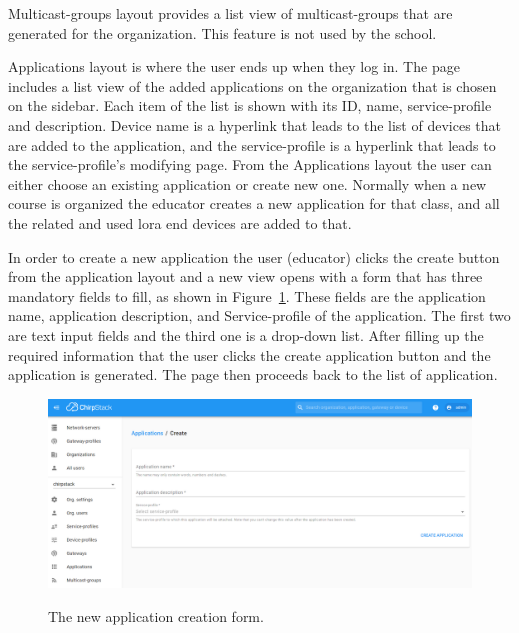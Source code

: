Multicast-groups layout provides a list view of multicast-groups that are generated for the organization.
This feature is not used by the school.

Applications layout is where the user ends up when they log in.
The page includes a list view of the added applications on the organization that is chosen on the sidebar.
Each item of the list is shown with its ID, name, service-profile and description.
Device name is a hyperlink that leads to the list of devices that are added to the application, and the service-profile is a hyperlink that leads to the service-profile's modifying page.
From the Applications layout the user can either choose an existing application or create new one.
Normally when a new course is organized the educator creates a new application for that class, and all the related and used \gls{lora} end devices are added to that.

In order to create a new application the user (educator) clicks the create button from the application layout and a new view opens with a form that has three mandatory fields to fill, as shown in Figure~\ref{fig:ChirpStack_new_application}.
These fields are the application name, application description, and Service-profile of the application.
The first two are text input fields and the third one is a drop-down list.
After filling up the required information that the user clicks the create application button and the application is generated.
The page then proceeds back to the list of application.

\begin{figure}[ht]
  \centering
  {\includegraphics[width=\textwidth]{illustration/ChirpStack_new_application.png}}
  \caption{The new application creation form.}
  \label{fig:ChirpStack_new_application}
\end{figure}

